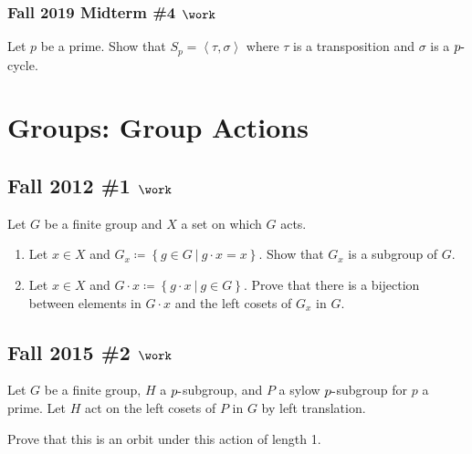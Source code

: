 \hypertarget{fall-2019-midterm-4-work}{%
\subsubsection{\texorpdfstring{Fall 2019 Midterm \#4
\(\work\)}{Fall 2019 Midterm \#4 \textbackslash work}}\label{fall-2019-midterm-4-work}}

Let \(p\) be a prime. Show that
\(S_p = \left\langle{\tau, \sigma}\right\rangle\) where \(\tau\) is a
transposition and \(\sigma\) is a \(p{\hbox{-}}\)cycle.

\hypertarget{groups-group-actions}{%
\section{Groups: Group Actions}\label{groups-group-actions}}

\hypertarget{fall-2012-1-work}{%
\subsection{\texorpdfstring{Fall 2012 \#1
\(\work\)}{Fall 2012 \#1 \textbackslash work}}\label{fall-2012-1-work}}

Let \(G\) be a finite group and \(X\) a set on which \(G\) acts.

\begin{enumerate}
\def\labelenumi{\alph{enumi}.}
\item
  Let \(x\in X\) and
  \(G_x \coloneqq\left\{{g\in G {~\mathrel{\Big|}~}g\cdot x = x}\right\}\).
  Show that \(G_x\) is a subgroup of \(G\).
\item
  Let \(x\in X\) and
  \(G\cdot x \coloneqq\left\{{g\cdot x {~\mathrel{\Big|}~}g\in G}\right\}\).
  Prove that there is a bijection between elements in \(G\cdot x\) and
  the left cosets of \(G_x\) in \(G\).
\end{enumerate}

\hypertarget{fall-2015-2-work}{%
\subsection{\texorpdfstring{Fall 2015 \#2
\(\work\)}{Fall 2015 \#2 \textbackslash work}}\label{fall-2015-2-work}}

Let \(G\) be a finite group, \(H\) a \(p{\hbox{-}}\)subgroup, and \(P\)
a sylow \(p{\hbox{-}}\)subgroup for \(p\) a prime. Let \(H\) act on the
left cosets of \(P\) in \(G\) by left translation.

Prove that this is an orbit under this action of length 1.

